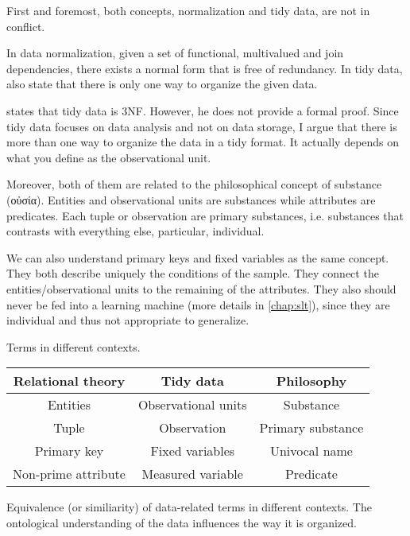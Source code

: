 First and foremost, both concepts, normalization and tidy data, are not in conflict.

In data normalization, given a set of functional, multivalued and join dependencies, there
exists a normal form that is free of redundancy.  In tidy data,
\citeauthor{Wickham2023} also state that there is only one way to organize the given data.

\textcite{Wickham2014} states that tidy data is 3NF.  However, he does not provide a
formal proof.  Since tidy data focuses on data analysis and not on data storage, I argue
that there is more than one way to organize the data in a tidy format.  It actually
depends on what you define as the observational unit.

Moreover, both of them are related to the philosophical concept of substance (οὐσία).
Entities and observational units are substances while attributes are predicates.
Each tuple or observation are primary substances, i.e. substances that contrasts with
everything else, particular, individual.

We can also understand primary keys and fixed variables as the same concept.  They both
describe uniquely the conditions of the sample.  They connect the entities/observational
units to the remaining of the attributes.  They also should never be fed into a learning
machine (more details in \cref{chap:slt}), since they are individual and thus not
appropriate to generalize.

\begin{tablebox}[label=fig:bridge]{Terms in different contexts.}
  \centering
  \begin{tabular}{ccc}
    \toprule
    \textbf{Relational theory} & \textbf{Tidy data} & \textbf{Philosophy} \\
    \midrule
    Entities & Observational units & Substance \\
    Tuple & Observation & Primary substance \\
    Primary key & Fixed variables & Univocal name \\
    Non-prime attribute & Measured variable & Predicate \\
    \bottomrule
  \end{tabular}
  \tcblower
  Equivalence (or similiarity) of data-related terms in different contexts.
  The ontological understanding of the data influences the way it is organized.
\end{tablebox}


